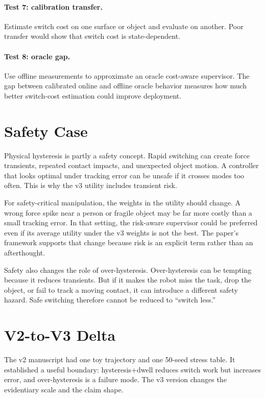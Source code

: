 \documentclass{article}
\begin{document}
\paragraph{Test 7: calibration transfer.}
Estimate switch cost on one surface or object and evaluate on another.
Poor transfer would show that switch cost is state-dependent.

\paragraph{Test 8: oracle gap.}
Use offline measurements to approximate an oracle cost-aware supervisor.
The gap between calibrated online and offline oracle behavior measures how much better switch-cost estimation could improve deployment.

\section{Safety Case}

Physical hysteresis is partly a safety concept.
Rapid switching can create force transients, repeated contact impacts, and unexpected object motion.
A controller that looks optimal under tracking error can be unsafe if it crosses modes too often.
This is why the v3 utility includes transient risk.

For safety-critical manipulation, the weights in the utility should change.
A wrong force spike near a person or fragile object may be far more costly than a small tracking error.
In that setting, the risk-aware supervisor could be preferred even if its average utility under the v3 weights is not the best.
The paper's framework supports that change because risk is an explicit term rather than an afterthought.

Safety also changes the role of over-hysteresis.
Over-hysteresis can be tempting because it reduces transients.
But if it makes the robot miss the task, drop the object, or fail to track a moving contact, it can introduce a different safety hazard.
Safe switching therefore cannot be reduced to ``switch less.''

\section{V2-to-V3 Delta}

The v2 manuscript had one toy trajectory and one 50-seed stress table.
It established a useful boundary: hysteresis+dwell reduces switch work but increases error, and over-hysteresis is a failure mode.
The v3 version changes the evidentiary scale and the claim shape.
\end{document}

